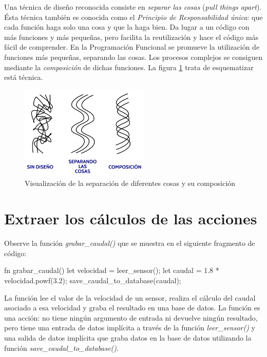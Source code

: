 Una técnica de diseño reconocida consiste en \textit{separar las cosas} (\textit{pull things apart}). Ésta técnica también es conocida como el \textit{Principio de Responsabilidad única}:  que cada función haga solo una cosa y que la haga bien. Da lugar a un código con más funciones y más pequeñas, pero facilita la reutilización y hace el código más fácil de comprender. En la Programación Funcional se promueve la utilización de funciones más pequeñas, separando las cosas. Los procesos complejos se consiguen mediante la \textit{composición} de dichas funciones. La figura \ref{fig_composicion_1} trata de esquematizar está técnica.

\begin{figure}[htb]
   \begin{center}
      \includegraphics[width=0.55\textwidth]{img/composicion_1.png}
      \caption{Visualización de la separación de diferentes cosas y su composición}
      \label{fig_composicion_1}
   \end{center}
\end{figure}

\section{Extraer los cálculos de las acciones}
Observe la función \textit{grabar\_caudal()} que se muestra en el siguiente fragmento de código:

\vspace{0.7em}
\begin{Codigo}
fn grabar_caudal() {
   let velocidad = leer_sensor();
   let caudal = 1.8 * velocidad.powf(3.2);
   save_caudal_to_database(caudal);
}
\end{Codigo}

La función lee el valor de la velocidad de un sensor, realiza el cálculo del caudal asociado a esa velocidad y graba el resultado en una base de datos. La función es una acción: no tiene ningún argumento de entrada ni devuelve ningún resultado, pero tiene una entrada de datos implícita a través de la función \textit{leer\_sensor()} y una salida de datos implícita que graba datos en la base de datos utilizando la función \textit{save\_caudal\_to\_database()}.  

